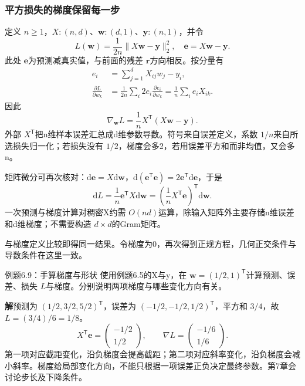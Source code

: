 \documentclass[UTF8,fontset=none,zihao=-4,a4paper]{ctexart}
\newcommand{\sol}{\par\noindent\textbf{解}\quad}
\numberwithin{equation}{section}
\numberwithin{figure}{section}
\begin{document}
\subsubsection{平方损失的梯度保留每一步}
定义 $n\ge1$，$X:(n,d)$、$\symbf w:(d,1)$、$\symbf y:(n,1)$，并令
\[
 L(\symbf w)=\frac1{2n}\|X\symbf w-\symbf y\|_2^2,
 \quad\symbf e=X\symbf w-\symbf y.
\]
此处 $\symbf e$为预测减真实值，与前面的残差 $\symbf r$方向相反。按分量有
\begin{align*}
 e_i&=\sum_{j=1}^dX_{ij}w_j-y_i,\\
 \frac{\partial L}{\partial w_k}
 &=\frac1{2n}\sum_i2e_i\frac{\partial e_i}{\partial w_k}
 =\frac1n\sum_i e_iX_{ik}.
\end{align*}
因此
\begin{equation}\label{eq:linear-gradient}
 \boxed{\nabla_{\symbf w}L=\frac1nX^{\mathsf T}(X\symbf w-\symbf y)}.
\end{equation}
外部 $X^{\mathsf T}$把n维样本误差汇总成d维参数导数。符号来自误差定义，系数 $1/n$来自所选损失归一化；若损失没有 $1/2$，梯度会多2，若用误差平方和而非均值，又会多n。

矩阵微分可再次核对：$\mathrm d\symbf e=X\mathrm d\symbf w$，$\mathrm d(\symbf e^{\mathsf T}\symbf e)=2\symbf e^{\mathsf T}\mathrm d\symbf e$，于是
\[
 \mathrm dL=\frac1n\symbf e^{\mathsf T}X\mathrm d\symbf w
 =\left(\frac1nX^{\mathsf T}\symbf e\right)^{\mathsf T}\mathrm d\symbf w.
\]
一次预测与梯度计算对稠密X约需 $O(nd)$运算，除输入矩阵外主要存储n维误差和d维梯度；不需要构造 $d\times d$的Gram矩阵。

与梯度定义比较即得同一结果。令梯度为0，再次得到正规方程，几何正交条件与导数条件在这里一致。

\begin{infobox}{例题6.9：手算梯度与形状}
使用例题6.5的X与y，在 $\symbf w=(1/2,1)^{\mathsf T}$计算预测、误差、损失 $L$与梯度。分别说明两项梯度与哪些变化方向有关。
\end{infobox}
\sol 预测为 $(1/2,3/2,5/2)^{\mathsf T}$，误差为 $(-1/2,-1/2,1/2)^{\mathsf T}$，平方和 $3/4$，故 $L=(3/4)/6=1/8$。
\[
 X^{\mathsf T}\symbf e=\begin{pmatrix}-1/2\\1/2\end{pmatrix},\qquad
 \nabla L=\begin{pmatrix}-1/6\\1/6\end{pmatrix}.
\]
第一项对应截距变化，沿负梯度会提高截距；第二项对应斜率变化，沿负梯度会减小斜率。梯度给局部变化方向，不能只根据一项误差正负决定最终参数。第7章会讨论步长及下降条件。
\end{document}
